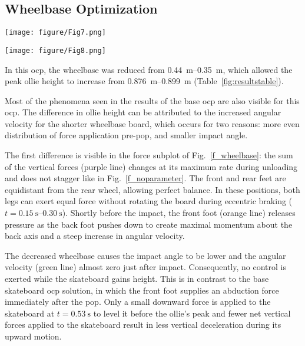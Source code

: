 \documentclass[default,iicol,pdflatex]{sn-jnl}
\begin{document}
\subsection{Wheelbase Optimization}
%
\begin{figure*}
    \centering
    \texttt{[image: figure/Fig7.png]}
    \caption[Trajectory, positions, speeds, and forces for wheelbase optimization]{Detailed trajectory of optimized wheelbase}\label{f_wheelbase}
\end{figure*}

\begin{figure*}
    \centering
    \texttt{[image: figure/Fig8.png]}
    \caption[Trajectory, positions, speeds, and forces for `all except tail length' optimization]{Detailed trajectory of optimization of all parameters except the tail}\label{f_notail}
\end{figure*}

In this \gls{ocp}, the wheelbase was reduced from \SIrange{0.44}{0.35}{\meter}, which allowed the peak ollie height to increase from \SIrange{0.876}{0.899}{\meter} (Table~\ref{fig:resultstable}).

Most of the phenomena seen in the results of the base \gls{ocp} are also visible for this \gls{ocp}.
The difference in ollie height can be attributed to the increased angular velocity for the shorter wheelbase board, which occurs for two reasons: more even distribution of force application pre-pop, and smaller impact angle.

The first difference is visible in the force subplot of Fig.~\ref{f_wheelbase}: the sum of the vertical forces (purple line) changes at its maximum rate during unloading and does not stagger like in Fig.~\ref{f_noparameter}.
The front and rear feet are equidistant from the rear wheel, allowing perfect balance.
In these positions, both legs can exert equal force without rotating the board during eccentric braking ($t=\SIrange{0.15}{0.30}{\second}$). 
Shortly before the impact, the front foot (orange line) releases pressure as the back foot pushes down to create maximal momentum about the back axis and a steep increase in angular velocity.

The decreased wheelbase causes the impact angle to be lower and the angular velocity (green line) almost zero just after impact.
Consequently, no control is exerted while the skateboard gains height.
This is in contrast to the base skateboard \gls{ocp} solution, in which the front foot supplies an abduction force immediately after the pop.
Only a small downward force is applied to the skateboard at $t=\SI{0.53}{\second}$ to level it before the ollie's peak and fewer net vertical forces applied to the skateboard result in less vertical deceleration during its upward motion.
\end{document}
